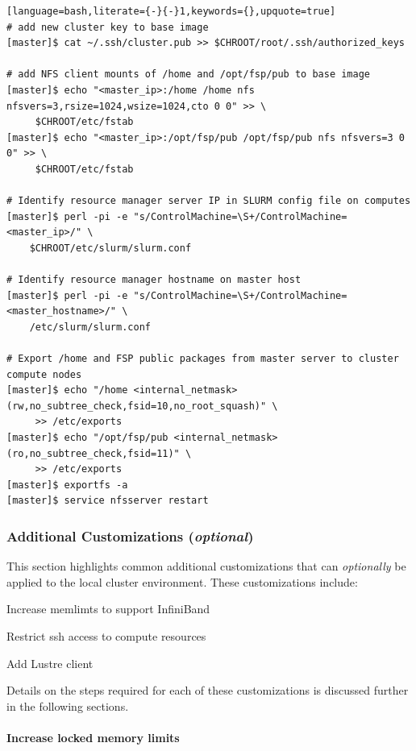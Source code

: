 \documentclass[letterpaper]{article}
\begin{document}
\begin{lstlisting}[language=bash,literate={-}{-}1,keywords={},upquote=true]
# add new cluster key to base image
[master]$ cat ~/.ssh/cluster.pub >> $CHROOT/root/.ssh/authorized_keys

# add NFS client mounts of /home and /opt/fsp/pub to base image
[master]$ echo "<master_ip>:/home /home nfs nfsvers=3,rsize=1024,wsize=1024,cto 0 0" >> \
     $CHROOT/etc/fstab
[master]$ echo "<master_ip>:/opt/fsp/pub /opt/fsp/pub nfs nfsvers=3 0 0" >> \
     $CHROOT/etc/fstab

# Identify resource manager server IP in SLURM config file on computes
[master]$ perl -pi -e "s/ControlMachine=\S+/ControlMachine=<master_ip>/" \
    $CHROOT/etc/slurm/slurm.conf

# Identify resource manager hostname on master host
[master]$ perl -pi -e "s/ControlMachine=\S+/ControlMachine=<master_hostname>/" \
    /etc/slurm/slurm.conf

# Export /home and FSP public packages from master server to cluster compute nodes
[master]$ echo "/home <internal_netmask>(rw,no_subtree_check,fsid=10,no_root_squash)" \
     >> /etc/exports
[master]$ echo "/opt/fsp/pub <internal_netmask>(ro,no_subtree_check,fsid=11)" \
     >> /etc/exports
[master]$ exportfs -a
[master]$ service nfsserver restart
\end{lstlisting}


\subsubsection{Additional Customizations ({\em optional})}

This section highlights common additional customizations that
can {\em optionally} be applied to the
local cluster environment. These customizations include:

\begin{itemize*}
\item Increase memlimts to support InfiniBand
\item Restrict ssh access to compute resources
\item Add Lustre client
\end{itemize*}

\noindent Details on the steps required for each of these customizations is
discussed further in the following sections.

\paragraph{Increase locked memory limits}
\end{document}
